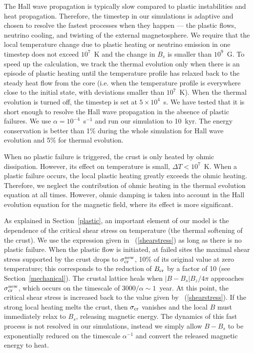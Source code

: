 The Hall wave propagation is typically slow compared to plastic instabilities and heat propagation. 
Therefore, the timestep in our simulations is adaptive and chosen to resolve the fastest processes when they happen --- the plastic flows, neutrino cooling, and twisting of the external magnetosphere. 
We require that the local temperature change due to plastic heating or neutrino emission in one timestep does not exceed $10^7$~K and the change in $B_s$ is smaller than $10^{9}$~G. 
To speed up the calculation, we track the thermal evolution only when there is an episode of plastic heating until the temperature profile has relaxed back to the steady heat flow from the core (i.e. when the temperature profile is everywhere close to the initial state, with deviations smaller than $10^7$~K). 
When the thermal evolution is turned off, the timestep is set at $5\times 10^4$~s. 
We have tested that it is short enough to resolve the Hall wave propagation in the absence of plastic failures. 
We use $\alpha= 10^{-4}$~s$^{-1}$ and run our simulation to 10~kyr. 
The energy conservation is better than 1\% during the whole simulation for Hall wave evolution and 5\% for thermal evolution.


When no plastic failure is triggered, the crust is only heated by ohmic dissipation.
However, its effect on temperature is small, $\Delta T<10^7$~K. When a plastic failure occurs, the local plastic heating greatly exceeds the ohmic heating. 
Therefore, we neglect the contribution of ohmic heating in the thermal evolution equation at all times. 
However, ohmic damping is taken into account in the Hall evolution equation for the magnetic field, where its effect is more significant.

As explained in Section~\ref{plastic}, an important element of our model is the dependence of the critical shear stress on temperature (the thermal softening of the crust). 
We use the expression given in \Eq~(\ref{shearstress}) as long as there is no plastic failure. When the plastic flow is initiated, at failed sites the maximal shear stress supported by the crust drops to $\sigma_{\rm cr}^{\rm new}$, 10\% of its original value at zero temperature; this corresponds to the reduction of $B_{\rm cr}$ by a factor of 10 (see Section~\ref{mechanical}).
The crustal lattice heals when $|B-B_s|B_z/4\pi$ approaches $\sigma_{\rm cr}^{\rm new}$, which occurs on the timescale of $3000/\alpha\sim 1$~year. At this point, the critical shear stress is increased back to the value given by \Eq~(\ref{shearstress}).
If the strong local heating melts the crust, then $\sigma_{\rm cr}$ vanishes and the local $B$ must immediately relax to $B_s$, releasing magnetic energy. 
The dynamics of this fast process is not resolved in our simulations, instead we simply allow $B-B_s$ to be exponentially reduced on the timescale $\alpha^{-1}$ and convert the released magnetic energy to heat.

